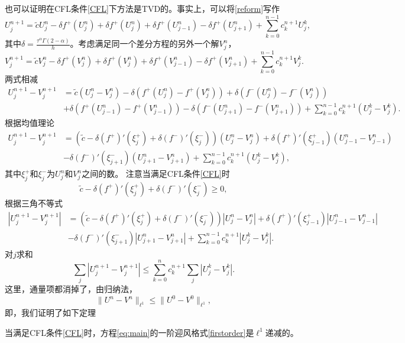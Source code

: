 也可以证明在CFL条件\eqref{CFL}下方法是TVD的。事实上，可以将\eqref{reform}写作
\begin{equation}
U_j^{n+1}=\tilde c U_j^{n}-\delta f^+(U^n_j) +\delta f^+(U^n_j)  + \delta f^+(U^n_{j-1})-\delta f^+(U^n_{j+1})+ \sum_{k=0}^{n-1} c^{n+1}_k U_j^k,
\end{equation}
其中$\delta =\frac{  \tau^\alpha\Gamma (2-\alpha)}  {h }$。考虑满足同一个差分方程的另外一个解$V^n_j$，
\begin{equation}
V_j^{n+1}=\tilde c V_j^{n}-\delta f^+(V^n_j) +\delta f^+(V^n_j)  + \delta f^+(V^n_{j-1})-\delta f^+(V^n_{j+1})+ \sum_{k=0}^{n-1} c^{n+1}_k V_j^k.
\end{equation}
两式相减
\begin{align*}
U_j^{n+1}-V_j^{n+1} &=\tilde c \left( U_j^{n}-V_j^{n}\right) -\delta \left(f^+(U^n_j)-f^+(V^n_j) \right) +\delta \left(f^-(U^n_j)-f^-(V^n_j) \right) \\
& +\delta \left(f^+(U^n_{j-1})-f^+(V^n_{j-1}) \right) - \delta \left(f^-(U^n_{j+1})-f^-(V^n_{j+1}) \right) + \sum_{k=0}^{n-1} c^{n+1}_k \left( U_j^k- V_j^k \right).
\end{align*}
根据均值理论
\begin{align*}
U_j^{n+1}-V_j^{n+1} &=\left(\tilde c -\delta (f^+)'(\xi_j^+) +\delta (f^-)'(\xi_j^-)\right)\left( U_j^{n}-V_j^{n}\right)+\delta   (f^+)'(\xi_{j-1}^+) \left( U_{j-1}^{n}-V_{j-1}^{n}\right) \\
& - \delta   (f^-)'(\xi_{j+1}^-) \left( U_{j+1}^{n}-V_{j+1}^{n}\right) + \sum_{k=0}^{n-1} c^{n+1}_k \left( U_j^k- V_j^k \right),
\end{align*}
其中$\xi_j^+$和$\xi_j^-$为$U^{n}_j$和$V^{n}_j$之间的数。
注意当满足CFL条件\eqref{CFL}时
\[
\tilde c -\delta (f^+)'(\xi_j^+) +\delta (f^-)'(\xi_j^-) \ge0,
\]
根据三角不等式
\begin{align*}
\left| U_j^{n+1}-V_j^{n+1} \right| &=\left(\tilde c -\delta (f^+)'(\xi_j^+) +\delta (f^-)'(\xi_j^-)\right)\left| U_j^{n}-V_j^{n}\right|+\delta   (f^+)'(\xi_{j-1}^+) \left| U_{j-1}^{n}-V_{j-1}^{n}\right| \\
& - \delta   (f^-)'(\xi_{j+1}^-) \left| U_{j+1}^{n}-V_{j+1}^{n}\right| + \sum_{k=0}^{n-1} c^{n+1}_k \left| U_j^k- V_j^k \right|.
\end{align*}
对$j$求和
\[
\sum_j \left|U^{n+1}_j-V^{n+1}_{j} \right|  \le  \sum_{k=0}^{n} c^{n+1}_k   \sum_j  \left| U_j^k- V_{j}^k\right|.
\]
这里，通量项都消掉了，由归纳法，
\[
 \|U^n-V^n\|_{\ell^1} \le \|U^0-V^0\|_{\ell^1},
 \] 
即，我们证明了如下定理
\begin{thm}
当满足CFL条件\eqref{CFL}时，方程\eqref{eq:main}的一阶迎风格式\eqref{firstorder}是$\ell^1$递减的。
\end{thm}

